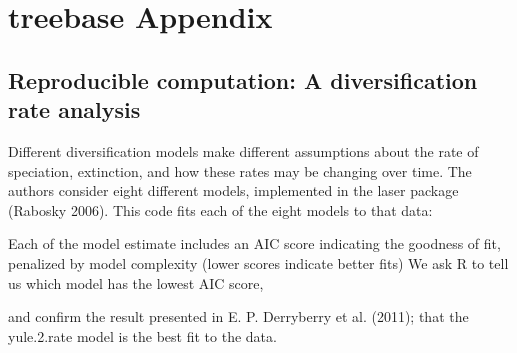 

\chapter{treebase Appendix}
\section{Reproducible computation: A diversification rate analysis}

Different diversification models make different assumptions about the
rate of speciation, extinction, and how these rates may be changing over
time. The authors consider eight different models, implemented in the
laser package (Rabosky 2006). This code fits each of the eight models to
that data:

\begin{Shaded}
\begin{Highlighting}[]
\NormalTok{(}
   
   
   
   
   
   
   
   
\end{Highlighting}
\end{Shaded}
Each of the model estimate includes an AIC score indicating the goodness
of fit, penalized by model complexity (lower scores indicate better
fits) We ask R to tell us which model has the lowest AIC score,

\begin{Shaded}
\begin{Highlighting}[]
\NormalTok{(models[}\NormalTok{(aics)])}
\end{Highlighting}
\end{Shaded}
and confirm the result presented in E. P. Derryberry et al. (2011); that
the yule.2.rate model is the best fit to the data.

